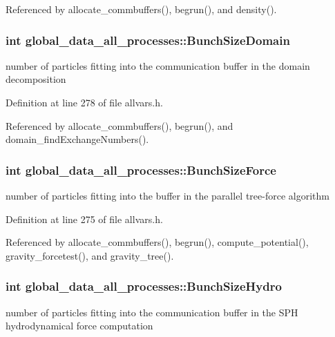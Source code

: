 Referenced by allocate\_\-commbuffers(), begrun(), and density().

\hypertarget{structglobal__data__all__processes_abf3206e6032910640e91585c25bd85b2}{
\subsubsection[{BunchSizeDomain}]{\setlength{\rightskip}{0pt plus 5cm}int {\bf global\_\-data\_\-all\_\-processes::BunchSizeDomain}}}
\label{structglobal__data__all__processes_abf3206e6032910640e91585c25bd85b2}
number of particles fitting into the communication buffer in the domain decomposition 

Definition at line 278 of file allvars.h.



Referenced by allocate\_\-commbuffers(), begrun(), and domain\_\-findExchangeNumbers().

\hypertarget{structglobal__data__all__processes_a2f6d4697219a2ec2e3db7f09ab31bcea}{
\subsubsection[{BunchSizeForce}]{\setlength{\rightskip}{0pt plus 5cm}int {\bf global\_\-data\_\-all\_\-processes::BunchSizeForce}}}
\label{structglobal__data__all__processes_a2f6d4697219a2ec2e3db7f09ab31bcea}
number of particles fitting into the buffer in the parallel tree-\/force algorithm 

Definition at line 275 of file allvars.h.



Referenced by allocate\_\-commbuffers(), begrun(), compute\_\-potential(), gravity\_\-forcetest(), and gravity\_\-tree().

\hypertarget{structglobal__data__all__processes_afe2775a289a902710358d98ba607a0aa}{
\subsubsection[{BunchSizeHydro}]{\setlength{\rightskip}{0pt plus 5cm}int {\bf global\_\-data\_\-all\_\-processes::BunchSizeHydro}}}
\label{structglobal__data__all__processes_afe2775a289a902710358d98ba607a0aa}
number of particles fitting into the communication buffer in the SPH hydrodynamical force computation 

